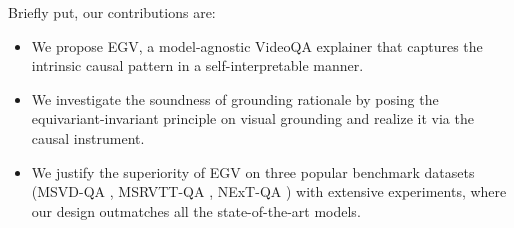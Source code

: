 Briefly put, our contributions are: 
\begin{itemize}[leftmargin=*]
    \item We propose EGV, a model-agnostic VideoQA explainer that captures the intrinsic causal pattern in a self-interpretable manner.
    
    \item We investigate the soundness of grounding rationale by posing the equivariant-invariant principle on visual grounding and realize it via the causal instrument.
    
    \item We justify the superiority of EGV on three popular benchmark datasets (\ie MSVD-QA \cite{DBLP:conf/mm/XuZX0Z0Z17}, MSRVTT-QA \cite{DBLP:conf/mm/XuZX0Z0Z17},  NExT-QA \cite{DBLP:conf/cvpr/XiaoSYC21}) with extensive experiments, where our design outmatches all the state-of-the-art models.
\end{itemize}













